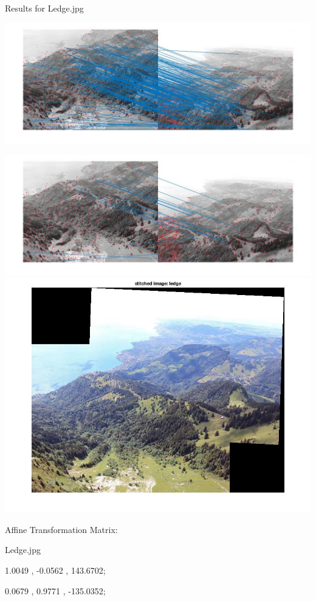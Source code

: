 \documentclass[fleqn]{article}
\begin{document}
Results for Ledge.jpg
\begin{center}
\includegraphics[width=1.2\textwidth]{ledge1.jpg}

\includegraphics[width=1.2\textwidth]{ledge2.jpg}
\newline
\includegraphics[width=1.2\textwidth]{ledge3.jpg}

Affine Transformation Matrix:
\vspace{10 mm}

Ledge.jpg

1.0049   ,   -0.0562   ,     143.6702;

0.0679   ,   0.9771    ,     -135.0352;

\end{center}
\end{document}
